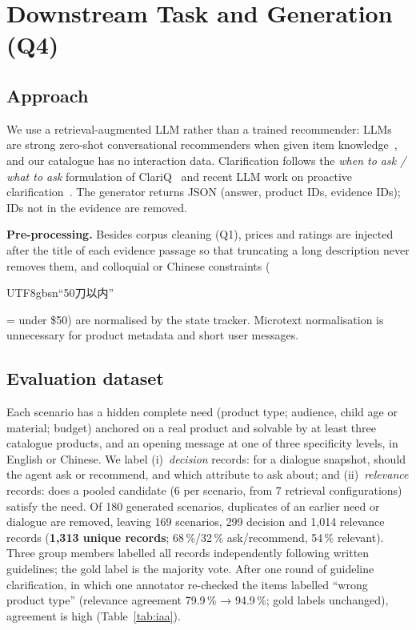 \documentclass[10pt,a4paper,twocolumn]{article}
\newcommand{\zh}[1]{\begin{CJK}{UTF8}{gbsn}#1\end{CJK}}
\newcommand{\zh}[1]{[Chinese text]}
\newcommand{\zh}[1]{{\zhfont #1}}
\begin{document}
\section{Downstream Task and Generation (Q4)}
\subsection{Approach}
We use a retrieval-augmented LLM rather than a trained recommender: LLMs are strong zero-shot conversational recommenders when given item knowledge~\cite{he2023}, and our catalogue has no interaction data. Clarification follows the \emph{when to ask / what to ask} formulation of ClariQ~\cite{aliannejadi2020} and recent LLM work on proactive clarification~\cite{deng2023,zhang2025}. The generator returns JSON (answer, product IDs, evidence IDs); IDs not in the evidence are removed.

\textbf{Pre-processing.} Besides corpus cleaning (Q1), prices and ratings are injected after the title of each evidence passage so that truncating a long description never removes them, and colloquial or Chinese constraints (\zh{“50刀以内”} = under \$50) are normalised by the state tracker. Microtext normalisation is unnecessary for product metadata and short user messages.

\subsection{Evaluation dataset}\label{sec:data}
Each scenario has a hidden complete need (product type; audience, child age or material; budget) anchored on a real product and solvable by at least three catalogue products, and an opening message at one of three specificity levels, in English or Chinese. We label (i)~\emph{decision} records: for a dialogue snapshot, should the agent ask or recommend, and which attribute to ask about; and (ii)~\emph{relevance} records: does a pooled candidate (6 per scenario, from 7 retrieval configurations) satisfy the need. Of 180 generated scenarios, duplicates of an earlier need or dialogue are removed, leaving 169 scenarios, 299 decision and 1,014 relevance records (\textbf{1,313 unique records}; 68\,\%/32\,\% ask/recommend, 54\,\% relevant). Three group members labelled all records independently following written guidelines; the gold label is the majority vote. After one round of guideline clarification, in which one annotator re-checked the items labelled ``wrong product type'' (relevance agreement 79.9\,\% → 94.9\,\%; gold labels unchanged), agreement is high (Table~\ref{tab:iaa}).
\end{document}
